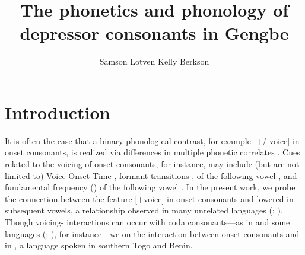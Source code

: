 \documentclass[output=paper
,newtxmath
,modfonts
,nonflat]{langsci/langscibook}
\author{Samson Lotven\affiliation{Indiana University Bloomington} \lastand Kelly Berkson\affiliation{Indiana University Bloomington} }
\title{The phonetics and phonology of depressor consonants in Gengbe}
\begin{document}
\maketitle
 \newcommand{\nocaption}[1]{{\color{red} Please provide a caption}}
 

 

 

 

 

 
\section{Introduction}\label{sec:lotven:1}
It is often the case that a binary phonological contrast, for example [+/-voice] in onset consonants, is realized via differences in multiple phonetic correlates \citep{wright2004}. Cues related to the voicing of onset consonants, for instance, may include (but are not limited to) Voice Onset Time \citep{Lisker1964}, formant transitions \citep{Stevens1973},  of the following vowel \citep{Chistovich1969}, and fundamental frequency ()  of the following vowel \citep{Shimizu1989}. In the present work, we probe the connection between the feature [+voice] in onset consonants and lowered  in subsequent vowels, a relationship observed in many unrelated languages (\citealt{Bradshaw1999}; \citealt{Tang2008}). Though voicing- interactions can occur with coda consonants—as in  and some  languages (\citealt{Maran1973}; \citealt{Matisoff1973}), for instance—we  on the interaction between onset consonants and  in , a  language spoken in southern Togo and Benin.
\end{document}

